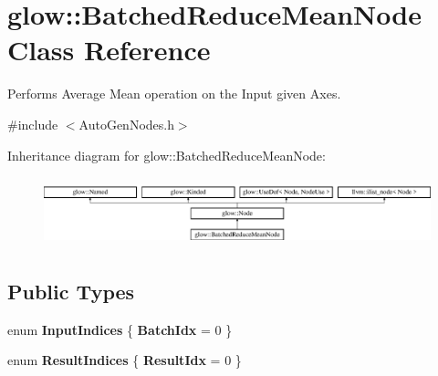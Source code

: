 \hypertarget{classglow_1_1_batched_reduce_mean_node}{}\section{glow\+:\+:Batched\+Reduce\+Mean\+Node Class Reference}
\label{classglow_1_1_batched_reduce_mean_node}


Performs Average Mean operation on the Input given Axes.  




{\ttfamily \#include $<$Auto\+Gen\+Nodes.\+h$>$}

Inheritance diagram for glow\+:\+:Batched\+Reduce\+Mean\+Node\+:\begin{figure}[H]
\begin{center}
\leavevmode
\includegraphics[height=2.028986cm]{classglow_1_1_batched_reduce_mean_node}
\end{center}
\end{figure}
\subsection*{Public Types}
\begin{DoxyCompactItemize}
\item 
\mbox{\label{classglow_1_1_batched_reduce_mean_node_ab2923aadf119ec1526e43549a2e45abb}} 
enum {\bfseries Input\+Indices} \{ {\bfseries Batch\+Idx} = 0
 \}
\item 
\mbox{\label{classglow_1_1_batched_reduce_mean_node_a0028f9c4274c152f8262134b63382a48}} 
enum {\bfseries Result\+Indices} \{ {\bfseries Result\+Idx} = 0
 \}
\end{DoxyCompactItemize}
